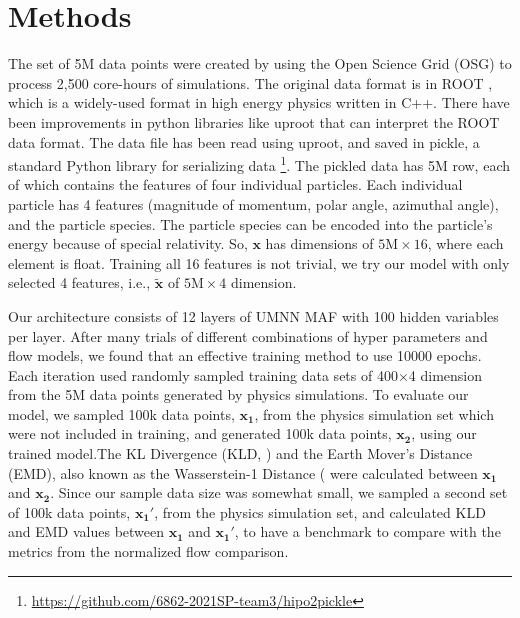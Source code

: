 \section{Methods}
The set of 5M data points were created by using the Open Science Grid (OSG) to process 2,500 core-hours of simulations. The original data format is in ROOT \cite{root}, which is a widely-used format in high energy physics written in C++. There have been improvements in python libraries like uproot \cite{uproot} that can interpret the ROOT data format. The data file has been read using uproot, and saved in pickle, a standard Python library for serializing data \footnote{\url{https://github.com/6862-2021SP-team3/hipo2pickle}}. The pickled data has 5M row, each of which contains the features of four individual particles. Each individual particle has 4 features (magnitude of momentum, polar angle, azimuthal angle), and the particle species. The particle species can be encoded into the particle's energy because of special relativity. So, $\mathbf{x}$ has dimensions of $5\text{M}\times16$, where each element is float. Training all 16 features is not trivial, we try our model with only selected 4 features, i.e., $\mathbf{\tilde{x}}$ of $5\text{M}\times4$ dimension. %


Our architecture consists of 12 layers of UMNN MAF with 100 hidden variables per layer. After many trials of different combinations of hyper parameters and flow models, we found that an effective training method to use 10000 epochs. Each iteration used randomly sampled training data sets of 400$\times$4 dimension from the 5M data points generated by physics simulations. To evaluate our model, we sampled 100k data points, $\mathbf{x_1}$, from the physics simulation set which were not included in training, and generated 100k data points, $\mathbf{x_2}$, using our trained model.The KL Divergence (KLD, \citet{Kullback51klDivergence}) and the Earth Mover's Distance (EMD), also known as the Wasserstein-1 Distance (\citet{Dobrushin} were calculated between $\mathbf{x_1}$ and $\mathbf{x_2}$. Since our sample data size was somewhat small, we sampled a second set of 100k data points, $\mathbf{x_1'}$, from the physics simulation set, and calculated KLD and EMD values between  $\mathbf{x_1}$ and $\mathbf{x_1'}$, to have a benchmark to compare with the metrics from the normalized flow comparison.





